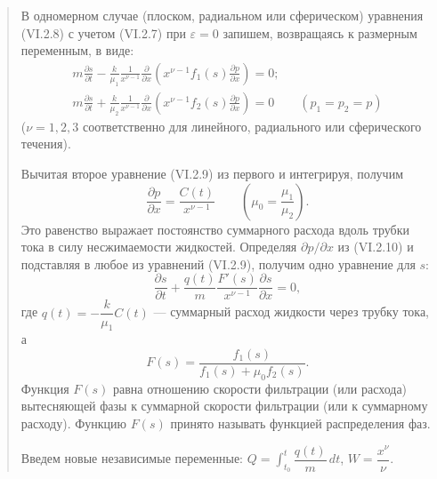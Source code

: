 \documentclass[12pt,a4paper]{article}
\begin{document}
\begin{quote}\sloppy
В одномерном случае (плоском, радиальном или сферическом)
уравнения (VI.2.8) с учетом (VI.2.7) при $\varepsilon=0$ запишем, возвращаясь к размерным переменным, в виде:
\begin{equation}\begin{gathered}
m\frac{\partial s}{\partial t}-\frac{k}{\mu_1}\frac{1}{x^{\nu-1}}\frac{\partial}{\partial x}\left(x^{\nu-1}f_1(s)\frac{\partial p}{\partial x}\right)=0;\\
m\frac{\partial s}{\partial t}+\frac{k}{\mu_2}\frac{1}{x^{\nu-1}}\frac{\partial}{\partial x}\left(x^{\nu-1}f_2(s)\frac{\partial p}{\partial x}\right)=0\qquad(p_1=p_2=p)
\end{gathered}\tag{VI.2.9}\label{q11:eq-VI-2-9}\end{equation}
($\nu=1,2,3$ соответственно для линейного, радиального или сферического течения).

Вычитая второе уравнение (VI.2.9) из первого и интегрируя, получим
\begin{equation}[f_1(s)+\mu_0f_2(s)]\frac{\partial p}{\partial x}=\frac{C(t)}{x^{\nu-1}}\qquad\left(\mu_0=\frac{\mu_1}{\mu_2}\right).\tag{VI.2.10}\label{q11:eq-VI-2-10}\end{equation}
Это равенство выражает постоянство суммарного расхода вдоль трубки тока в силу несжимаемости жидкостей. Определяя $\partial p/\partial x$ из (VI.2.10) и подставляя в любое из уравнений (VI.2.9), получим одно уравнение для $s$:
\begin{equation}\frac{\partial s}{\partial t}+\frac{q(t)}{m}\frac{F'(s)}{x^{\nu-1}}\frac{\partial s}{\partial x}=0,\tag{VI.2.11}\label{q11:eq-VI-2-11}\end{equation}
где $q(t)=-\dfrac{k}{\mu_1}C(t)$ --- суммарный расход жидкости через трубку тока, а
\[F(s)=\frac{f_1(s)}{f_1(s)+\mu_0f_2(s)}.\]
Функция $F(s)$ равна отношению скорости фильтрации (или расхода) вытесняющей фазы к суммарной скорости фильтрации (или к суммарному расходу). Функцию $F(s)$ принято называть функцией распределения фаз.

Введем новые независимые переменные: $Q=\int_{t_0}^t\dfrac{q(t)}{m}\,dt$, $W=\dfrac{x^\nu}{\nu}$.


\end{quote}
\end{document}
